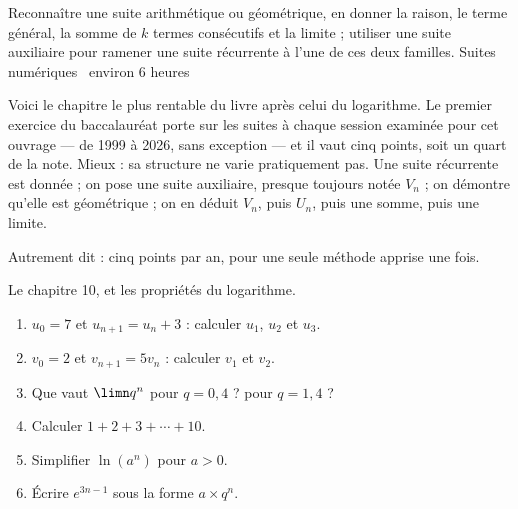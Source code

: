   {Reconnaître une suite arithmétique ou géométrique, en donner la raison, le
   terme général, la somme de $k$ termes consécutifs et la limite ; utiliser
   une suite auxiliaire pour ramener une suite récurrente à l'une de ces deux
   familles.}
  {Suites numériques \textbullet\ environ 6 heures}

Voici le chapitre le plus rentable du livre après celui du logarithme. Le
premier exercice du baccalauréat porte sur les suites à chaque session
examinée pour cet ouvrage — de 1999 à 2026, sans exception — et il vaut cinq
points, soit un quart de la note. Mieux : sa structure ne varie pratiquement
pas. Une suite récurrente est donnée ; on pose une suite auxiliaire, presque
toujours notée $V_{n}$ ; on démontre qu'elle est géométrique ; on en déduit
$V_{n}$, puis $U_{n}$, puis une somme, puis une limite.

Autrement dit : cinq points par an, pour une seule méthode apprise une fois.

\begin{revision}
Le chapitre 10, et les propriétés du logarithme.

\begin{enumerate}[label=\textbf{\arabic*.}, leftmargin=*, itemsep=0.35em]
  \item $u_{0} = 7$ et $u_{n+1} = u_{n}+3$ : calculer $u_{1}$, $u_{2}$ et
        $u_{3}$.
  \item $v_{0} = 2$ et $v_{n+1} = 5v_{n}$ : calculer $v_{1}$ et $v_{2}$.
  \item Que vaut $\limn q^{n}$ pour $q = 0{,}4$ ? pour $q = 1{,}4$ ?
  \item Calculer $1+2+3+\cdots+10$.
  \item Simplifier $\ln\left(a^{n}\right)$ pour $a>0$.
  \item Écrire $e^{3n-1}$ sous la forme $a\times q^{n}$.
\end{enumerate}
\end{revision}

